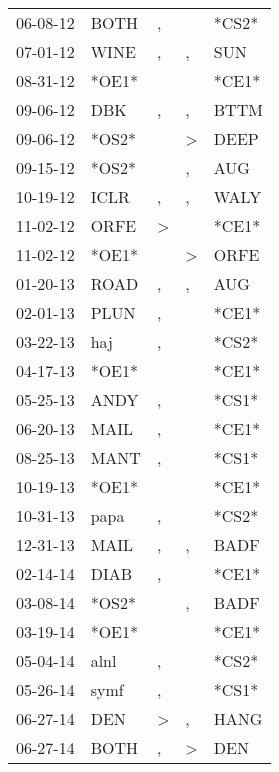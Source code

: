 \begin{supertabular}{lllll}
 06-08-12 &   BOTH &             , &               &  *CS2* \\
 07-01-12 &   WINE &             , &             , &    SUN \\
 08-31-12 &  *OE1* &               &               &  *CE1* \\
 09-06-12 &    DBK &             , &             , &   BTTM \\
 09-06-12 &  *OS2* &               &  \textgreater &   DEEP \\
 09-15-12 &  *OS2* &               &             , &    AUG \\
 10-19-12 &   ICLR &             , &             , &   WALY \\
 11-02-12 &   ORFE &  \textgreater &               &  *CE1* \\
 11-02-12 &  *OE1* &               &  \textgreater &   ORFE \\
 01-20-13 &   ROAD &             , &             , &    AUG \\
 02-01-13 &   PLUN &             , &               &  *CE1* \\
 03-22-13 &    haj &             , &               &  *CS2* \\
 04-17-13 &  *OE1* &               &               &  *CE1* \\
 05-25-13 &   ANDY &             , &               &  *CS1* \\
 06-20-13 &   MAIL &             , &               &  *CE1* \\
 08-25-13 &   MANT &             , &               &  *CS1* \\
 10-19-13 &  *OE1* &               &               &  *CE1* \\
 10-31-13 &   papa &             , &               &  *CS2* \\
 12-31-13 &   MAIL &             , &             , &   BADF \\
 02-14-14 &   DIAB &             , &               &  *CE1* \\
 03-08-14 &  *OS2* &               &             , &   BADF \\
 03-19-14 &  *OE1* &               &               &  *CE1* \\
 05-04-14 &   alnl &             , &               &  *CS2* \\
 05-26-14 &   symf &             , &               &  *CS1* \\
 06-27-14 &    DEN &  \textgreater &             , &   HANG \\
 06-27-14 &   BOTH &             , &  \textgreater &    DEN \\

\end{supertabular}
